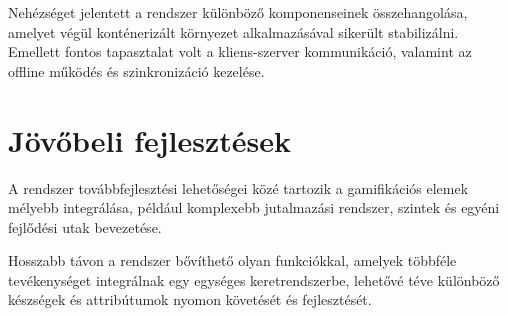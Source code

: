 \documentclass[
]{thesis-ekf}
\theoremstyle{definition}
\theoremstyle{remark}
\begin{document}
Nehézséget jelentett a rendszer különböző komponenseinek összehangolása, amelyet végül konténerizált környezet alkalmazásával sikerült stabilizálni. Emellett fontos tapasztalat volt a kliens-szerver kommunikáció, valamint az offline működés és szinkronizáció kezelése.

\section{Jövőbeli fejlesztések}

A rendszer továbbfejlesztési lehetőségei közé tartozik a gamifikációs elemek mélyebb integrálása, például komplexebb jutalmazási rendszer, szintek és egyéni fejlődési utak bevezetése.

Hosszabb távon a rendszer bővíthető olyan funkciókkal, amelyek többféle tevékenységet integrálnak egy egységes keretrendszerbe, lehetővé téve különböző készségek és attribútumok nyomon követését és fejlesztését.

\listoffigures





\end{document}
